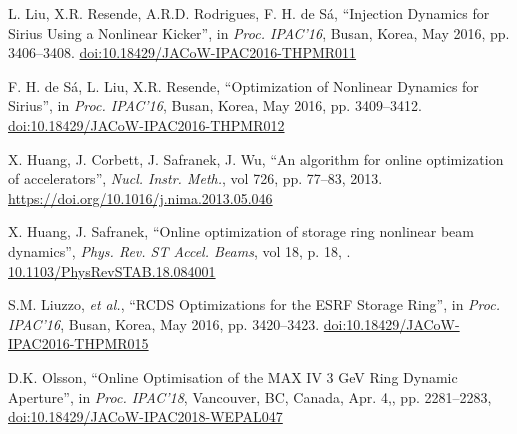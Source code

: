 \documentclass[a4paper,
               keeplastbox,   %
               ]{jacow}
\begin{document}
	\begin{thebibliography}{9} %
	
        

        L. Liu, X.R. Resende, A.R.D. Rodrigues, F. H. de Sá,
       \textquotedblleft{{I}njection {D}ynamics for {S}irius {U}sing a {N}onlinear {K}icker}\textquotedblright,
       in \emph{Proc. IPAC’16}, Busan, Korea, May 2016, pp. 3406--3408.
       \url{doi:10.18429/JACoW-IPAC2016-THPMR011} 
 
        F. H. de Sá, L. Liu, X.R. Resende,
       \textquotedblleft{{O}ptimization of {N}onlinear {D}ynamics for {S}irius}\textquotedblright,
       in \emph{Proc. IPAC’16}, Busan, Korea, May 2016, pp. 3409--3412.
       \url{doi:10.18429/JACoW-IPAC2016-THPMR012}       
       
		X. Huang, J. Corbett, J. Safranek, J. Wu,
		\textquotedblleft{An algorithm for online optimization of accelerators}\textquotedblright,
		\emph{Nucl.  Instr. Meth.}, vol 726, pp. 77--83, 2013.
        \url{https://doi.org/10.1016/j.nima.2013.05.046} 

		X. Huang, J. Safranek,
		\textquotedblleft{Online optimization of storage ring nonlinear beam dynamics}\textquotedblright,
		\emph{Phys. Rev. ST Accel. Beams}, vol 18, p. 18, .
        \url{10.1103/PhysRevSTAB.18.084001} 
 
        S.M. Liuzzo, \emph{et al.},
        \textquotedblleft{RCDS Optimizations for the ESRF Storage Ring}\textquotedblright,
        in \emph{Proc. IPAC’16}, Busan, Korea, May 2016, pp. 3420--3423.
       \url{doi:10.18429/JACoW-IPAC2016-THPMR015}   
    
       D.K. Olsson,
       \textquotedblleft{Online Optimisation of the MAX IV 3 GeV Ring Dynamic Aperture}\textquotedblright,
       in \emph{Proc. IPAC'18}, Vancouver, BC, Canada, Apr. 4,, pp. 2281--2283,
       \url{doi:10.18429/JACoW-IPAC2018-WEPAL047}
    

\end{thebibliography}
\end{document}

